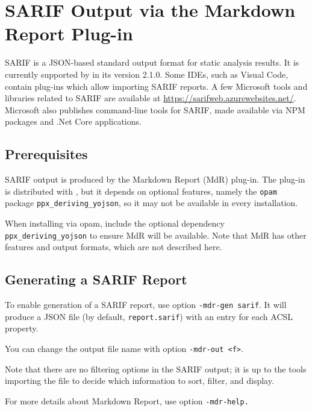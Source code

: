 \section{SARIF Output via the Markdown Report Plug-in}\label{sarif}

SARIF is a JSON-based standard output format for static analysis results.
It is currently supported by \FramaC in its version 2.1.0.
Some IDEs, such as Visual Code, contain plug-ins which allow importing SARIF
reports. A few Microsoft tools and libraries related to SARIF are available
at \url{https://sarifweb.azurewebsites.net/}. Microsoft also publishes
command-line tools for SARIF, made available via NPM packages and .Net Core
applications.

\subsection{Prerequisites}

SARIF output is produced by the \textsf{Markdown Report} (MdR) plug-in.
The plug-in is distributed with \FramaC, but it depends on optional
features, namely the \texttt{opam} package \texttt{ppx\_deriving\_yojson},
so it may not be available in every \FramaC installation.

When installing \FramaC via opam, include the optional dependency
\texttt{ppx\_deriving\_yojson} to ensure MdR will be available.
Note that MdR has other features and output formats, which are not described
here.

\subsection{Generating a SARIF Report}

To enable generation of a SARIF report, use option \texttt{-mdr-gen sarif}.
It will produce a JSON file (by default, \texttt{report.sarif}) with an entry
for each ACSL property.

You can change the output file name with option \texttt{-mdr-out <f>}.

Note that there are no filtering options in the SARIF output; it is up to the
tools importing the file to decide which information to sort, filter, and
display.

For more details about \textsf{Markdown Report}, use option \texttt{-mdr-help.}
